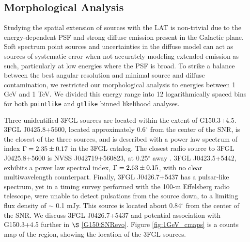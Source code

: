 \documentclass[iop]{emulateapj}
\newcommand{\ptlike}{{\tt pointlike}}
\newcommand{\gtlike}{{\tt gtlike}}
\newcommand{\Gone}{G150.3+4.5}
\newcommand{\psrLike}{3FGL J0426.7+5437}
\begin{document}
\subsection{Morphological Analysis}\label{G150:LATmorph}
Studying the spatial extension of sources with the LAT is non-trivial due to the energy-dependent PSF and strong diffuse emission present in the Galactic plane. Soft spectrum point sources and uncertainties in the diffuse model can act as sources of systematic error when not accurately modeling extended emission as such, particularly at low energies where the PSF is broad. To strike a balance between the best angular resolution and minimal source and diffuse contamination, we restricted our morphological analysis to energies between 1 GeV and 1 TeV. We divided this energy range into 12 logarithmically spaced bins for both \ptlike{} and \gtlike{} binned likelihood analyses. 

Three  unidentified 3FGL sources are located within the extent of \Gone{}. 3FGL J0425.8+5600, located approximately 0.6$^\circ$ from the center of the SNR, is the closest of the three sources, and is described with a power law spectrum of index ${\rm \Gamma = 2.35\pm 0.17}$  in the 3FGL catalog. The closest radio source to 3FGL J0425.8+5600 is NVSS J042719+560823, at 0.25$^\circ$ away \citep{Condon98}. 3FGL J0423.5+5442, exhibits a power law spectral index, ${\rm \Gamma = 2.63\pm 0.15}$, with no clear multiwavelength counterpart. Finally, \psrLike{} has a pulsar-like spectrum, yet in a timing survey performed with the 100-m  Effelsberg radio telescope, \cite{Barr13} were unable to detect pulsations from the source down, to a limiting flux density of $\sim$ 0.1 mJy. This source is located about 0.84$^{\circ}$ from the center of the SNR. We discuss \psrLike{} and potential association with \Gone{} further in $\S$ \ref{G150:SNRevo}. Figure \ref{fig:1GeV_cmaps} is a counts map of the region, showing the location of the 3FGL sources.
\end{document}
